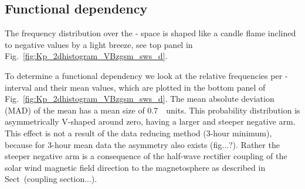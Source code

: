 \subsection{Functional dependency}
The frequency distribution over the \Kp-\vBz{} space is shaped like a candle flame inclined to negative values by a light breeze, see top panel in Fig.~\ref{fig:Kp_2dhistogram_VBzgsm_sws_d}.
\begin{figure}
\end{figure}

To determine a functional dependency we look at the relative frequencies per \vBz-interval and their mean \Kp{} values, which are plotted in the bottom panel of Fig.~\ref{fig:Kp_2dhistogram_VBzgsm_sws_d}. The mean absolute deviation (MAD) of the mean has a mean size of \SI{0.7}{\Kp~units}. This probability distribution is asymmetrically V-shaped around zero, having a larger and steeper negative arm. This effect is not a result of the data reducing method (3-hour minimum), because for 3-hour mean data the asymmetry also exists (fig...?). Rather the steeper negative arm is a consequence of the half-wave rectifier coupling of the solar wind magnetic field direction to the magnetosphere as described in Sect~(coupling section...).\\

